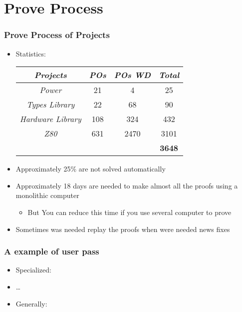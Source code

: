 \section{Prove Process}

\begin{frame}
\frametitle{Prove Process of Projects}

\begin{itemize}
   \item Statistics:\\
    \begin{center}{\footnotesize
  	 \begin{tabular}{|c|c|c|c|}
		\hline
		 \textsl{Projects} &  \textsl{POs}	& \textsl{POs WD} &	\textsl{Total}\\
		\hline
		\textit{Power} & 	21 &	4 &	25\\
		\hline
		\textit{Types Library} &	22 &	68 &	90\\
		\hline
		\textit{Hardware Library} &	108 &	324 &	432\\
		\hline
		\textit{Z80} &	631	 & 2470 & 	3101\\
		\hline
		   &    &  & 		\textbf{3648}\\
		\hline
	 \end{tabular}
   }
	\end{center}

   \item  Approximately 25\% are not solved automatically
	\item  Approximately 18 days are needed to make almost all the proofs using a monolithic computer
		\begin{itemize}
			\item But You can reduce this time if you use several computer to prove
		\end{itemize}
	\item  Sometimes was needed  replay the proofs when were needed news fixes
\end{itemize}

\end{frame}


\begin{frame}
\frametitle{A example of user pass}

\begin{itemize}
   \item Specialized:
   \item \ldots
   \item Generally:
\end{itemize}

\end{frame}



